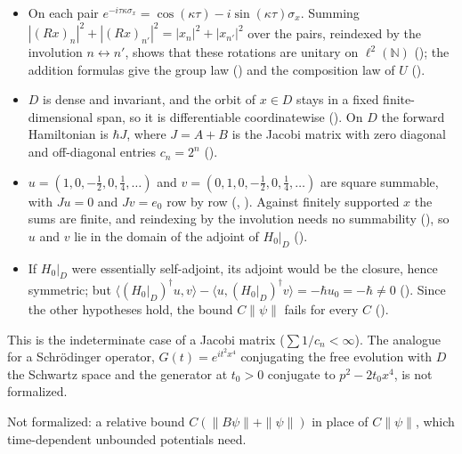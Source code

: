 \documentclass[11pt]{article}
\begin{document}
\begin{itemize}
\item On each pair $e^{-i\tau\kappa\sigma_x} = \cos(\kappa\tau) - i\sin(\kappa\tau)\sigma_x$. Summing
  $|(Rx)_n|^2 + |(Rx)_{n'}|^2 = |x_n|^2 + |x_{n'}|^2$ over the pairs, reindexed by the involution
  $n \leftrightarrow n'$, shows that these rotations are unitary on $\ell^2(\mathbb{N})$
  (); the addition formulas give the group law
  () and the composition law of $U$ ().
\item $D$ is dense and invariant, and the orbit of $x \in D$ stays in a fixed
  finite-dimensional span, so it is differentiable coordinatewise
  (). On $D$ the forward Hamiltonian is $\hbar J$, where
  $J = A + B$ is the Jacobi matrix with zero diagonal and off-diagonal entries $c_n = 2^n$
  ().
\item $u = (1, 0, -\tfrac12, 0, \tfrac14, \dots)$ and $v = (0, 1, 0, -\tfrac12, 0, \tfrac14, \dots)$
  are square summable, with $Ju = 0$ and $Jv = e_0$ row by row (,
  ). Against finitely supported $x$ the sums are finite, and reindexing by the
  involution needs no summability (), so $u$ and $v$ lie in the
  domain of the adjoint of $H_0|_D$ ().
\item If $H_0|_D$ were essentially self-adjoint, its adjoint would be the closure, hence
  symmetric; but $\langle (H_0|_D)^\dagger u, v\rangle - \langle u, (H_0|_D)^\dagger v\rangle =
  -\hbar u_0 = -\hbar \ne 0$ (). Since the other
  hypotheses hold, the bound $C\|\psi\|$ fails for every $C$ ().
\end{itemize}
This is the indeterminate case of a Jacobi matrix ($\sum 1/c_n < \infty$). The analogue for a
Schr\"odinger operator, $G(t) = e^{it^2x^4}$ conjugating the free evolution with $D$ the Schwartz
space and the generator at $t_0 > 0$ conjugate to $p^2 - 2t_0x^4$, is not formalized.

Not formalized: a relative bound $C(\|B\psi\| + \|\psi\|)$ in place of $C\|\psi\|$, which
time-dependent unbounded potentials need.
\end{document}
